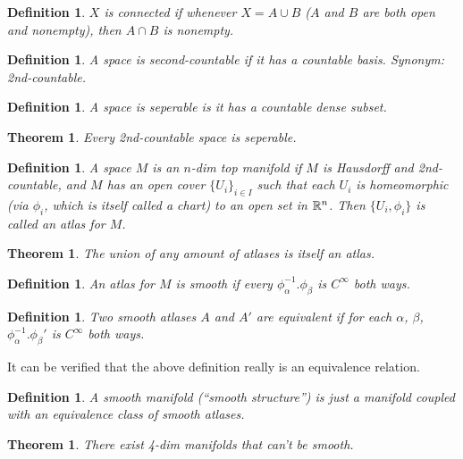 \documentclass[11pt,leqno,oneside]{amsart}
\theoremstyle{mystyle} \newtheorem{thrm}[thm]{Theorem}
\theoremstyle{mystyle} \newtheorem{defi}[thm]{Definition}
\begin{document}
\begin{defi}
	$X$ is \emph{connected} if whenever $X = A \cup B$ ($A$ and $B$ are both open and nonempty), then $A \cap B$ is nonempty.
\end{defi}

\begin{defi}
	A space is \emph{second-countable} if it has a countable basis.  Synonym: \emph{2nd-countable}.
\end{defi}
\begin{defi}
	A space is \emph{seperable} is it has a countable dense subset.
\end{defi}
\begin{thrm}
	Every 2nd-countable space is seperable.
\end{thrm}
\begin{defi}
	A space $M$ is an $n$-dim top \emph{manifold} if $M$ is Hausdorff and 2nd-countable, and $M$ has an open cover $\{U_i\}_{i \in I}$ such that each $U_i$ is homeomorphic (via $\phi_i$, which is itself called a \emph{chart}) to an open set in ${\mathbb R}^n$.  Then $\{ U_i, \phi_i \}$ is called an \emph{atlas} for $M$.
\end{defi}
\begin{thrm}
	The union of any amount of atlases is itself an atlas.
\end{thrm}

\begin{defi}
	An atlas for $M$ is \emph{smooth} if every $\phi_\alpha^{-1}.\phi_\beta$ is $C^\infty$ both ways.
\end{defi}

\begin{defi}
	Two smooth atlases $A$ and $A'$ are \emph{equivalent} if for each $\alpha$, $\beta$, $\phi_\alpha^{-1}.\phi_\beta'$ is $C^\infty$ both ways.
\end{defi}
\begin{rmk}
	It can be verified that the above definition really is an equivalence relation.
\end{rmk}

\begin{defi}
	A \emph{smooth} manifold (``smooth structure'') is just a manifold coupled with an equivalence class of smooth atlases.
\end{defi}

\begin{thrm}
	There exist 4-dim manifolds that can't be smooth.
\end{thrm}
\end{document}
